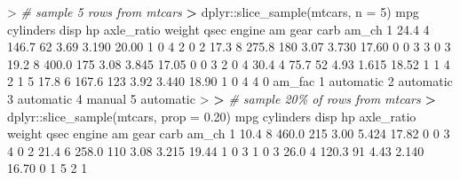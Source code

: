 \documentclass[
]{book}
\newenvironment{Shaded}{\begin{snugshade}}{\end{snugshade}}
\newcommand{\AttributeTok}[1]{\textcolor[rgb]{0.77,0.63,0.00}{#1}}
\newcommand{\CommentTok}[1]{\textcolor[rgb]{0.56,0.35,0.01}{\textit{#1}}}
\newcommand{\DecValTok}[1]{\textcolor[rgb]{0.00,0.00,0.81}{#1}}
\newcommand{\ErrorTok}[1]{\textcolor[rgb]{0.64,0.00,0.00}{\textbf{#1}}}
\newcommand{\FloatTok}[1]{\textcolor[rgb]{0.00,0.00,0.81}{#1}}
\newcommand{\FunctionTok}[1]{\textcolor[rgb]{0.00,0.00,0.00}{#1}}
\newcommand{\NormalTok}[1]{#1}
\newcommand{\SpecialCharTok}[1]{\textcolor[rgb]{0.00,0.00,0.00}{#1}}
\begin{document}
\begin{Shaded}
\begin{Highlighting}[]
\SpecialCharTok{\textgreater{}} \CommentTok{\# sample 5 rows from mtcars}
\ErrorTok{\textgreater{}}\NormalTok{ dplyr}\SpecialCharTok{::}\FunctionTok{slice\_sample}\NormalTok{(mtcars, }\AttributeTok{n =} \DecValTok{5}\NormalTok{)}
\NormalTok{   mpg cylinders  disp  hp axle\_ratio weight  qsec engine am gear carb am\_ch}
\DecValTok{1} \FloatTok{24.4}         \DecValTok{4} \FloatTok{146.7}  \DecValTok{62}       \FloatTok{3.69}  \FloatTok{3.190} \FloatTok{20.00}      \DecValTok{1}  \DecValTok{0}    \DecValTok{4}    \DecValTok{2}     \DecValTok{0}
\DecValTok{2} \FloatTok{17.3}         \DecValTok{8} \FloatTok{275.8} \DecValTok{180}       \FloatTok{3.07}  \FloatTok{3.730} \FloatTok{17.60}      \DecValTok{0}  \DecValTok{0}    \DecValTok{3}    \DecValTok{3}     \DecValTok{0}
\DecValTok{3} \FloatTok{19.2}         \DecValTok{8} \FloatTok{400.0} \DecValTok{175}       \FloatTok{3.08}  \FloatTok{3.845} \FloatTok{17.05}      \DecValTok{0}  \DecValTok{0}    \DecValTok{3}    \DecValTok{2}     \DecValTok{0}
\DecValTok{4} \FloatTok{30.4}         \DecValTok{4}  \FloatTok{75.7}  \DecValTok{52}       \FloatTok{4.93}  \FloatTok{1.615} \FloatTok{18.52}      \DecValTok{1}  \DecValTok{1}    \DecValTok{4}    \DecValTok{2}     \DecValTok{1}
\DecValTok{5} \FloatTok{17.8}         \DecValTok{6} \FloatTok{167.6} \DecValTok{123}       \FloatTok{3.92}  \FloatTok{3.440} \FloatTok{18.90}      \DecValTok{1}  \DecValTok{0}    \DecValTok{4}    \DecValTok{4}     \DecValTok{0}
\NormalTok{     am\_fac}
\DecValTok{1}\NormalTok{ automatic}
\DecValTok{2}\NormalTok{ automatic}
\DecValTok{3}\NormalTok{ automatic}
\DecValTok{4}\NormalTok{    manual}
\DecValTok{5}\NormalTok{ automatic}
\SpecialCharTok{\textgreater{}} 
\ErrorTok{\textgreater{}} \CommentTok{\# sample 20\% of rows from mtcars}
\ErrorTok{\textgreater{}}\NormalTok{ dplyr}\SpecialCharTok{::}\FunctionTok{slice\_sample}\NormalTok{(mtcars, }\AttributeTok{prop =} \FloatTok{0.20}\NormalTok{)}
\NormalTok{   mpg cylinders  disp  hp axle\_ratio weight  qsec engine am gear carb am\_ch}
\DecValTok{1} \FloatTok{10.4}         \DecValTok{8} \FloatTok{460.0} \DecValTok{215}       \FloatTok{3.00}  \FloatTok{5.424} \FloatTok{17.82}      \DecValTok{0}  \DecValTok{0}    \DecValTok{3}    \DecValTok{4}     \DecValTok{0}
\DecValTok{2} \FloatTok{21.4}         \DecValTok{6} \FloatTok{258.0} \DecValTok{110}       \FloatTok{3.08}  \FloatTok{3.215} \FloatTok{19.44}      \DecValTok{1}  \DecValTok{0}    \DecValTok{3}    \DecValTok{1}     \DecValTok{0}
\DecValTok{3} \FloatTok{26.0}         \DecValTok{4} \FloatTok{120.3}  \DecValTok{91}       \FloatTok{4.43}  \FloatTok{2.140} \FloatTok{16.70}      \DecValTok{0}  \DecValTok{1}    \DecValTok{5}    \DecValTok{2}     \DecValTok{1}

\end{Highlighting}
\end{Shaded}
\end{document}
